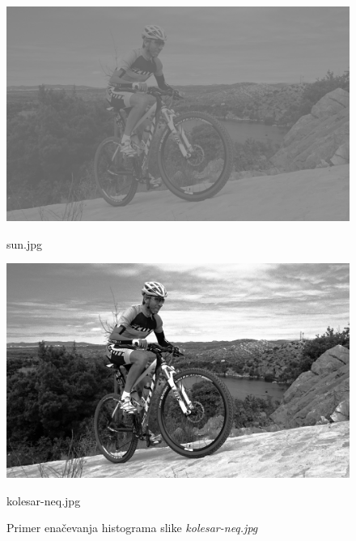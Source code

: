 \documentclass{article}
\begin{document}
\begin{figure}[!h]
    \begin{minipage}{0.48\textwidth}
        \centering
        \includegraphics[width=.9\linewidth]{images/kolesar-neq.jpg}
        \caption{sun.jpg}
    \end{minipage}\hfill
    \begin{minipage}{0.48\textwidth}
        \centering
        \includegraphics[width=.9\linewidth]{images/kolesar-neq-output.jpg}
        \caption{kolesar-neq.jpg}
    \end{minipage}
    \caption{Primer enačevanja histograma slike \textit{kolesar-neq.jpg}}
\end{figure}
\clearpage
\end{document}
